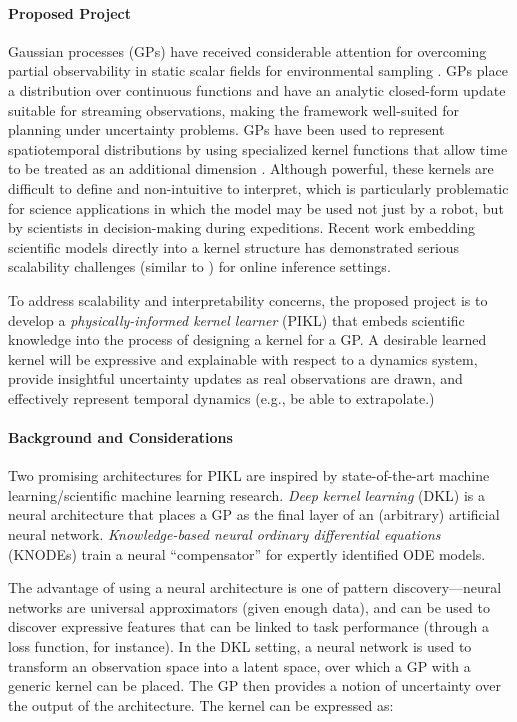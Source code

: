 \paragraph{Proposed Project}
Gaussian processes \autocite{Rasmussen2004} (GPs) have received considerable attention for overcoming partial observability in static scalar fields for environmental sampling \autocite{zhang2007adaptive,Hitz2017,Marchant2014a}.
GPs place a distribution over continuous functions and have an analytic closed-form update suitable for streaming observations, making the framework well-suited for planning under uncertainty problems.
GPs have been used to represent spatiotemporal distributions by using specialized kernel functions that allow time to be treated as an additional dimension \autocite{Marchant2014a,garg2012learning,singh2010modeling}.
Although powerful, these kernels are difficult to define and non-intuitive to interpret, which is particularly problematic for science applications in which the model may be used not just by a robot, but by scientists in decision-making during expeditions.
Recent work embedding scientific models directly into a kernel structure \autocite{raissi2018numerical} has demonstrated serious scalability challenges (similar to \PHUMES) for online inference settings.

To address scalability and interpretability concerns, the proposed project is to develop a \emph{physically-informed kernel learner} (PIKL) that embeds scientific knowledge into the process of designing a kernel for a GP. A desirable learned kernel will be expressive and explainable with respect to a dynamics system, provide insightful uncertainty updates as real observations are drawn, and effectively represent temporal dynamics (e.g., be able to extrapolate.)

\paragraph{Background and Considerations}
Two promising architectures for PIKL are inspired by state-of-the-art machine learning/scientific machine learning research. \emph{Deep kernel learning} \autocite{wilson2015kernel} (DKL) is a neural architecture that places a GP as the final layer of an (arbitrary) artificial neural network. \emph{Knowledge-based neural ordinary differential equations} \autocite{jiahao2021knowledge} (KNODEs) train a neural ``compensator'' for expertly identified ODE models.

The advantage of using a neural architecture is one of pattern discovery---neural networks are universal approximators (given enough data), and can be used to discover expressive features that can be linked to task performance (through a loss function, for instance). In the DKL setting, a neural network is used to transform an observation space into a latent space, over which a GP with a generic kernel can be placed. The GP then provides a notion of uncertainty over the output of the architecture. The kernel can be expressed as:

